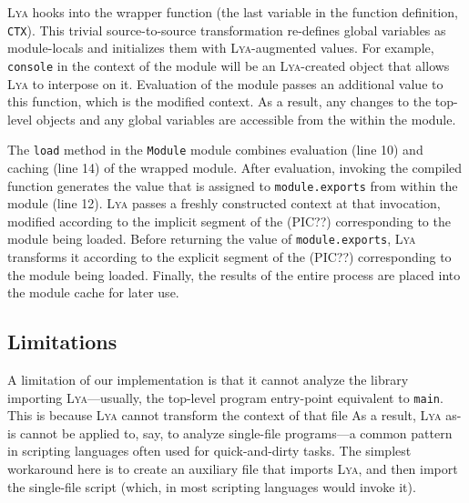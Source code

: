 \documentclass[letterpaper,twocolumn,10pt]{article}
\newcommand{\ttt}[1]{\texttt{#1}}
\newcommand{\sys}{{\scshape Lya}\xspace}
\begin{document}
\sys hooks into the wrapper function (the last variable in the function definition, \ttt{CTX}).
This trivial source-to-source transformation re-defines global variables as module-locals and initializes them with \sys-augmented values.
For example, \ttt{console} in the context of the module will be an \sys-created object that allows \sys to interpose on it.
Evaluation of the module passes an additional value to this function, which is the modified context.
As a result, any changes to the top-level objects and any global variables are accessible from the within the module.


The \ttt{load} method in the \ttt{Module} module combines evaluation (line 10) and caching (line 14) of the wrapped module.
After evaluation, invoking the compiled function generates the value that is assigned to \ttt{module.exports} from within the module (line 12).
\sys passes a freshly constructed context at that invocation, modified according to the implicit segment of the (PIC??) corresponding to the module being loaded.
Before returning the value of \ttt{module.exports}, \sys transforms it according to the explicit segment of the (PIC??) corresponding to the module being loaded.
Finally, the results of the entire process are placed into the module cache for later use.

\subsection{Limitations}

A limitation of our implementation is that it cannot analyze the library importing \sys---usually, the top-level program entry-point equivalent to \ttt{main}.
This is because \sys cannot transform the context of that file
As a result, \sys as-is cannot be applied to, say, to analyze single-file programs---a common pattern in scripting languages often used for quick-and-dirty tasks.
The simplest workaround here is to create an auxiliary file that imports \sys, and then import the single-file script (which, in most scripting languages would invoke it).
\end{document}
